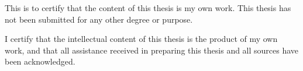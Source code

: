 


\begin{declaration}        %

This is to certify that the content of this thesis is my own work. This thesis has not been submitted for any other degree or purpose.

I certify that the intellectual content of this thesis is the product of my own work, and that all assistance received in preparing this thesis and all sources have been acknowledged.

\vspace{10mm}

\theauthor{}\\
\date{April 21st, 2015}
\end{declaration}


